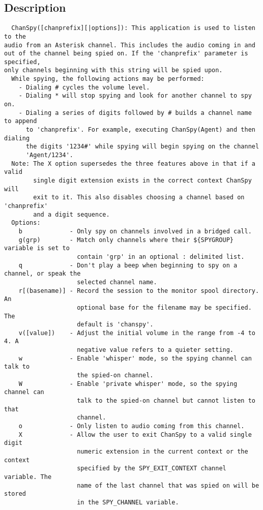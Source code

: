 \subsection{Description}
\begin{verbatim}
  ChanSpy([chanprefix][|options]): This application is used to listen to the
audio from an Asterisk channel. This includes the audio coming in and
out of the channel being spied on. If the 'chanprefix' parameter is specified,
only channels beginning with this string will be spied upon.
  While spying, the following actions may be performed:
    - Dialing # cycles the volume level.
    - Dialing * will stop spying and look for another channel to spy on.
    - Dialing a series of digits followed by # builds a channel name to append
      to 'chanprefix'. For example, executing ChanSpy(Agent) and then dialing
      the digits '1234#' while spying will begin spying on the channel
      'Agent/1234'.
  Note: The X option supersedes the three features above in that if a valid
        single digit extension exists in the correct context ChanSpy will
        exit to it. This also disables choosing a channel based on 'chanprefix'
        and a digit sequence.
  Options:
    b             - Only spy on channels involved in a bridged call.
    g(grp)        - Match only channels where their ${SPYGROUP} variable is set to
                    contain 'grp' in an optional : delimited list.
    q             - Don't play a beep when beginning to spy on a channel, or speak the
                    selected channel name.
    r[(basename)] - Record the session to the monitor spool directory. An
                    optional base for the filename may be specified. The
                    default is 'chanspy'.
    v([value])    - Adjust the initial volume in the range from -4 to 4. A
                    negative value refers to a quieter setting.
    w             - Enable 'whisper' mode, so the spying channel can talk to
                    the spied-on channel.
    W             - Enable 'private whisper' mode, so the spying channel can
                    talk to the spied-on channel but cannot listen to that
                    channel.
    o             - Only listen to audio coming from this channel.
    X             - Allow the user to exit ChanSpy to a valid single digit
                    numeric extension in the current context or the context
                    specified by the SPY_EXIT_CONTEXT channel variable. The
                    name of the last channel that was spied on will be stored
                    in the SPY_CHANNEL variable.

\end{verbatim}


